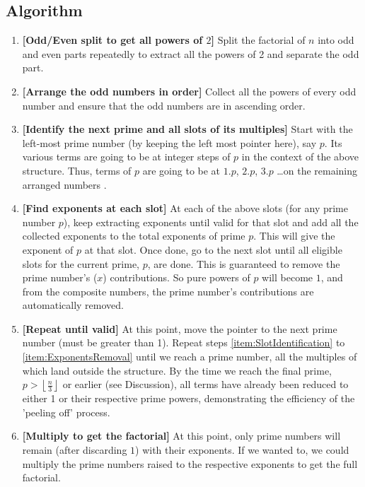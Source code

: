 \documentclass[10 pt,a4paper, article]{amsart}
\newcommand{\floor}[1]{\left\lfloor #1 \right\rfloor}
\begin{document}
\subsection{Algorithm}
\begin{enumerate}
	\item \textbf{[Odd/Even split to get all powers of $2$]} Split the factorial of $n$ into odd and even parts repeatedly to extract all the powers of 2 and separate the odd part.
	\item \textbf{[Arrange the odd numbers in order]} Collect all the powers of every odd number and ensure that the odd numbers are in ascending order.
	\item \textbf{[Identify the next prime and all slots of its multiples]} Start with the left-most prime number (by keeping the left most pointer here), say $p$. Its various terms are going to be at integer steps of $p$ in the context of the above structure. Thus, terms of $p$ are going to be at  $1.p$, $2.p$, $3.p$ \dots  on the remaining arranged numbers .\label{item:SlotIdentification}
	\item \textbf{[Find exponents at each slot]} At each of the above slots (for any prime number $p$), keep extracting exponents until valid for that slot and add all the collected exponents to the total exponents of prime $p$. This will give the exponent of $p$ at that slot. Once done, go to the next slot until all eligible slots for the current prime, $p$, are done. This is guaranteed to remove the prime number's ($x$) contributions. So pure powers of $p$ will become $1$, and from the composite numbers, the prime number's contributions are automatically removed.\label{item:ExponentsRemoval}
	\item \textbf{[Repeat until valid]} At this point, move the pointer to the next prime number (must be greater than 1). Repeat steps \ref{item:SlotIdentification} to \ref{item:ExponentsRemoval} until we reach a prime number, all the multiples of which land outside the structure. By the time we reach the final prime, $p > \floor{\frac{n}{3}}$ or earlier (see Discussion), all terms have already been reduced to either 1 or their respective prime powers, demonstrating the efficiency of the 'peeling off' process.
	\item \textbf{[Multiply to get the factorial]} At this point, only prime numbers will remain (after discarding $1$) with their exponents. If we wanted to, we could multiply the prime numbers raised to the respective exponents to get the full factorial.
\end{enumerate}
	
\end{document}
